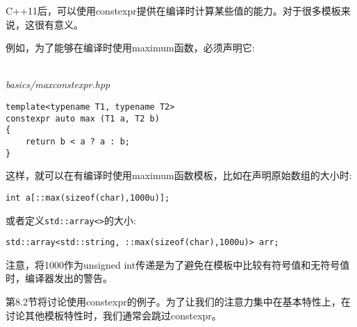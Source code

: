 
C++11后，可以使用constexpr提供在编译时计算某些值的能力。对于很多模板来说，这很有意义。

例如，为了能够在编译时使用maximum函数，必须声明它:

\hspace*{\fill} \\ %
\noindent
\textit{basics/maxconstexpr.hpp}
\begin{lstlisting}[style=styleCXX]
template<typename T1, typename T2>
constexpr auto max (T1 a, T2 b)
{
	return b < a ? a : b;
}
\end{lstlisting}

这样，就可以在有编译时使用maximum函数模板，比如在声明原始数组的大小时:

\begin{lstlisting}[style=styleCXX]
int a[::max(sizeof(char),1000u)];
\end{lstlisting}

或者定义\texttt{std::array<>}的大小:

\begin{lstlisting}[style=styleCXX]
std::array<std::string, ::max(sizeof(char),1000u)> arr;
\end{lstlisting}

注意，将1000作为unsigned int传递是为了避免在模板中比较有符号值和无符号值时，编译器发出的警告。

第8.2节将讨论使用constexpr的例子。为了让我们的注意力集中在基本特性上，在讨论其他模板特性时，我们通常会跳过constexpr。











